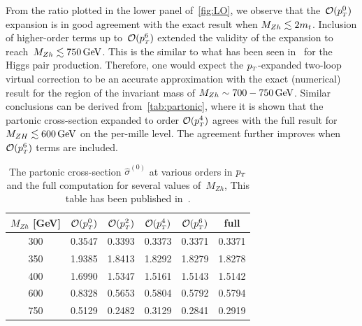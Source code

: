 From the ratio plotted in the lower panel of~\autoref{fig:LO}, we observe that the~$\mathcal{O}(p_{\scriptscriptstyle T}^0)$ expansion is in good agreement with the exact result when $M_{Zh}\lesssim 2m_t$. Inclusion of higher-order terms up to~$\mathcal{O}(p_{\scriptscriptstyle T}^6)$ extended the validity of the expansion to reach~$M_{Zh}\lesssim 750\,\textrm{GeV}$. This is the similar to what has been seen in~\cite{Bonciani:2018omm} for the Higgs pair production. Therefore, one would expect the $p_{\scriptscriptstyle T}$-expanded two-loop virtual correction to be an accurate approximation with the exact (numerical) result for the region of the invariant mass of  $M_{Zh}\sim 700-750\,\textrm{GeV}$. 
Similar conclusions can be derived from~\autoref{tab:partonic}, where it is shown that the partonic cross-section
expanded to order $\mathcal{O}(p_{\scriptscriptstyle T}^4)$ agrees with the full result for
$M_{ZH} \lesssim 600 \,\textrm{GeV}$  on the per-mille level.
The agreement further improves when $\mathcal{O}(p_{\scriptscriptstyle T}^6)$ terms are included.
\begin{table}
	\renewcommand{\arraystretch}{1.2}
	\centering
	\begin{tabular}{| c| c | c | c| c| c|} \hline
		\rowcolor{lightgray}  $M_{Zh}$ [GeV]  & $\mathcal{O}(p_{\scriptscriptstyle T}^0)$ & $\mathcal{O}(p_{\scriptscriptstyle T}^2)$ & $\mathcal{O}(p_{\scriptscriptstyle T}^4)$ & $\mathcal{O}(p_{\scriptscriptstyle T}^6)$ & full \\ \hline 
		\cellcolor{lightgray} 300 & 0.3547 & 0.3393 &  0.3373 &0.3371& 0.3371 \\
		\cellcolor{lightgray} 350 & 1.9385 & 1.8413& 1.8292 &1.8279& 1.8278 \\
		\cellcolor{lightgray} 400 & 1.6990 & 1.5347 & 1.5161 &1.5143& 1.5142 \\
		\cellcolor{lightgray} 600 & 0.8328 & 0.5653 & 0.5804 &0.5792&  0.5794 \\ 
		\cellcolor{lightgray} 750 & 0.5129 & 0.2482 & 0.3129 & 0.2841 &  0.2919 \\ \hline
	\end{tabular}
	\caption{The partonic cross-section $\hat{\sigma}^{(0)}$ at
		various orders in $p_{\scriptscriptstyle T}$ and the full computation for several values of~$M_{Zh}$, This table has been published in~\cite{Alasfar:2021ppe}. \label{tab:partonic}}
\end{table}
